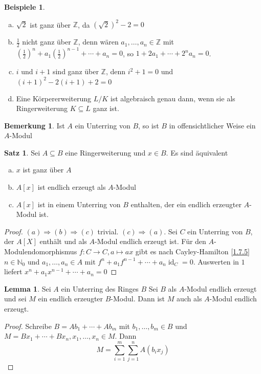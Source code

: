 \documentclass[
twoside=semi,
fontsize=12,
DIV=12, 
cleardoublepage=current,
leqno,
headings=optiontoheadandtoc, 
toc=idx
]{scrbook}
\newcommand{\N}{\mathbb{N}}
\newcommand{\Z}{\mathbb{Z}}
\newcommand{\brac}[1]{\left( #1 \right)}
\DeclareMathOperator{\id}{id}
\theoremstyle{definition}
\newtheorem{bemerkung}[definition]{Bemerkung}
\newtheorem{beispiele}[definition]{Beispiele}
\newtheorem{satz}[definition]{Satz}
\newtheorem{lemma}[definition]{Lemma}
\begin{document}
	\begin{beispiele}\label{2.1.3}
		\begin{enumerate}[(a)]
			\item $\sqrt{2}$ ist ganz \"uber $\Z$, da $(\sqrt{2})^2 -2 = 0$
			\item $\frac{1}{2}$ nicht ganz \"uber $\Z$, denn w\"aren $a_1,\dots, a_n \in \Z$ mit $\brac{\frac{1}{2}}^n + a_1\brac{\frac{1}{2}}^{n-1} + \cdots + a_n = 0$, so $1 + 2a_1 + \cdots + 2^na_n = 0$.
			\item $i$ und $i+1$ sind ganz \"uber $\Z$, denn $i^2+1 = 0$ und $(i+1)^2 - 2(i+1)+2 = 0$
			\item Eine K\"orpererweiterung $L/K$ ist algebraisch genau dann, wenn sie als Ringerweiterung $K \subseteq L$ ganz ist.
		\end{enumerate}	
	\end{beispiele}

	\begin{bemerkung}\label{2.1.4}
		Ist $A$ ein Unterring von $B$, so ist $B$ in offensichtlicher Weise ein $A$-Modul
	\end{bemerkung}

	\begin{satz}\label{2.1.5}
		Sei $A \subseteq B$ eine Ringerweiterung und $x \in B$. Es sind \"aquivalent
		\begin{enumerate}[(a)]
			\item $x$ ist ganz \"uber $A$
			\item $A[x]$ ist endlich erzeugt als $A$-Modul
			\item $A[x]$ ist in einem Unterring von $B$ enthalten, der ein endlich erzeugter $A$-Modul ist.
		\end{enumerate}
	
		\begin{proof}
			$(a)\Rightarrow (b)\Rightarrow(c)$ trivial.\newline
			$(c) \Rightarrow (a)$. Sei $C$ ein Unterring von $B$, der $A[X]$ enth\"alt und als $A$-Modul endlich erzeugt ist.
			F\"ur den $A$-Modulendomorphismus $f:C\to C, a\mapsto ax$ gibt es nach Cayley-Hamilton \ref{1.7.5} $n\in\N_0$ und $a_1,\dots, a_n\in A$ mit 
			$f^n +a_1f^{n-1}+\cdots+a_n\id_C= 0$. Auswerten in $1$ liefert $x^n+a_1x^{n-1}+\cdots+a_n = 0$ 
 		\end{proof}
	\end{satz}

	\begin{lemma}\label{2.1.6}
		Sei $A$ ein Unterring des Ringes $B$ Sei $B$ als $A$-Modul endlich erzeugt und sei $M$ ein endlich erzeugter $B$-Modul. Dann ist $M$ auch als $A$-Modul endlich erzeugt.
		
		\begin{proof}
			Schreibe $B=Ab_1 + \cdots + Ab_m$ mit $b_1, \dots, b_m \in B$ und $M = Bx_1 + \cdots + Bx_n, x_1, \dots, x_n \in M$. Dann 
			\[M = \sum_{i=1}^{m} \sum_{j=1}^{n} A(b_ix_j)\]
		\end{proof}
	\end{lemma}
	
\end{document}
